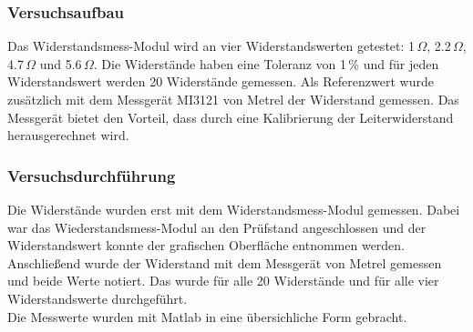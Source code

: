 \subsubsection{Versuchsaufbau}
Das Widerstandsmess-Modul wird an vier Widerstandswerten getestet: 1\,\(\Omega\), 2.2\,\(\Omega\), 4.7\,\(\Omega\) und 5.6\,\(\Omega\). Die Widerstände haben eine Toleranz von 1\,\% und für jeden Widerstandswert werden 20 Widerstände gemessen. Als Referenzwert wurde zusätzlich mit dem Messgerät MI3121 von Metrel der Widerstand gemessen. Das Messgerät bietet den Vorteil, dass durch eine Kalibrierung der Leiterwiderstand herausgerechnet wird.

\subsubsection{Versuchsdurchführung}
\noindent
Die Widerstände wurden erst mit dem Widerstandsmess-Modul gemessen. Dabei war das Wiederstandsmess-Modul an den Prüfstand angeschlossen und der Widerstandswert konnte der grafischen Oberfläche entnommen werden. Anschließend wurde der Widerstand mit dem Messgerät von Metrel gemessen und beide Werte notiert. Das wurde für alle 20 Widerstände und für alle vier Widerstandswerte durchgeführt.
\\
Die Messwerte wurden mit Matlab in eine übersichliche Form gebracht.

